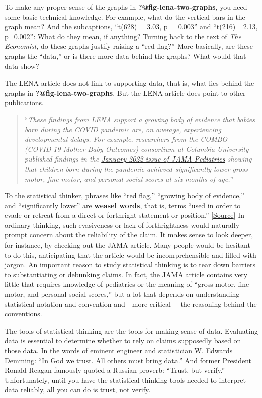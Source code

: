 \documentclass[
  letterpaper,
  DIV=11,
  numbers=noendperiod,
  oneside]{scrreprt}
\begin{document}
To make any proper sense of the graphs in
\textbf{?@fig-lena-two-graphs}, you need some basic technical knowledge.
For example, what do the vertical bars in the graph mean? And the
subcaptions, ``t(628) = 3.03, p = 0.003'' and ``t(216)= 2.13, p=0.002'':
What do they mean, if anything? Turning back to the text of \emph{The
Economist}, do these graphs justify raising a ``red flag?'' More
basically, are these graphs the ``data,'' or is there more data behind
the graphs? What would that data show?

The LENA article does not link to supporting data, that is, what lies
behind the graphs in \textbf{?@fig-lena-two-graphs}. But the LENA
article does point to other publications.

\begin{quote}
``\emph{These findings from LENA support a growing body of evidence that
babies born during the COVID pandemic are, on average, experiencing
developmental delays. For example, researchers from the COMBO (COVID-19
Mother Baby Outcomes) consortium at Columbia University published
findings in the
\href{www/jamapediatrics_shuffrey_2022_oi_210081_1653493590.2509.pdf}{January
2022 issue of JAMA Pediatrics} showing that children born during the
pandemic achieved significantly lower gross motor, fine motor, and
personal-social scores at six months of age.}''
\end{quote}

To the statistical thinker, phrases like ``red flag,'' ``growing body of
evidence,'' and ``significantly lower'' are \textbf{weasel words}, that
is, terms ``used in order to evade or retreat from a direct or
forthright statement or position.''
{[}\href{https://www.merriam-webster.com/dictionary/weasel\%20word}{Source}{]}
In ordinary thinking, such evasiveness or lack of forthrightness would
naturally prompt concern about the reliability of the claim. It makes
sense to look deeper, for instance, by checking out the JAMA article.
Many people would be hesitant to do this, anticipating that the article
would be incomprehensible and filled with jargon. An important reason to
study statistical thinking is to tear down barriers to substantiating or
debunking claims. In fact, the JAMA article contains very little that
requires knowledge of pediatrics or the meaning of ``gross motor, fine
motor, and personal-social scores,'' but a lot that depends on
understanding statistical notation and convention and---more critical
---the reasoning behind the conventions.

The tools of statistical thinking are the tools for making sense of
data. Evaluating data is essential to determine whether to rely on
claims supposedly based on those data. In the words of eminent engineer
and statistician
\href{https://en.wikipedia.org/wiki/W._Edwards_Deming}{W. Edwards
Demming}: ``In God we trust. All others must bring data.'' And former
President Ronald Reagan famously quoted a Russian proverb: ``Trust, but
verify.'' Unfortunately, until you have the statistical thinking tools
needed to interpret data reliably, all you can do is trust, not verify.
\end{document}
